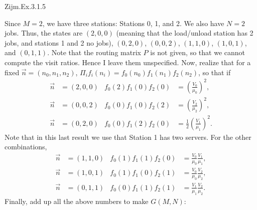 \begin{question}
Zijm.Ex.3.1.5
\begin{solution}
  Since $M=2$, we have three stations: Stations 0, 1, and 2. We also
  have $N=2$ jobs. Thus, the states are $(2,0,0)$ (meaning that the
  load/unload station has 2 jobs, and stations 1 and 2 no jobs),
  $(0,2,0)$, $(0,0,2)$, $(1,1,0)$, $(1,0,1)$, and $(0,1,1)$. Note that
  the routing matrix $P$ is not given, so that we cannot compute the
  visit ratios. Hence I leave them unspecified. Now, realize that for
  a fixed $\vec n=(n_0, n_1, n_2)$,
  $\Pi_i f_i(n_i) = f_0(n_0)f_1(n_1)f_2(n_2)$, so that if 
  \begin{align*}
    \vec n &= (2,0,0) & f_0(2)f_1(0)f_2(0) &= \left(\frac{V_0}{\mu_0}\right)^2, \\
    \vec n &= (0,0,2) & f_0(0)f_1(0)f_2(2) &= \left(\frac{V_2}{\mu_2}\right)^2, \\
    \vec n &= (0,2,0) & f_0(0)f_1(2)f_2(0) &= \frac12\left(\frac{V_1}{\mu_1}\right)^2.
  \end{align*}
  Note that in this last result we use that Station 1 has two servers. For the other combinations, 
  \begin{align*}
    \vec n &= (1,1,0) & f_0(1)f_1(1)f_2(0) &= \frac{V_0}{\mu_0}\frac{V_1}{\mu_1}, \\
    \vec n &= (1,0,1) & f_0(1)f_1(0)f_2(1) &= \frac{V_0}{\mu_0}\frac{V_2}{\mu_2}, \\
    \vec n &= (0,1,1) & f_0(0)f_1(1)f_2(1) &= \frac{V_1}{\mu_1}\frac{V_2}{\mu_2}.
  \end{align*}
Finally, add up all the above numbers to make $G(M,N)$: 


\end{solution}
\end{question}

